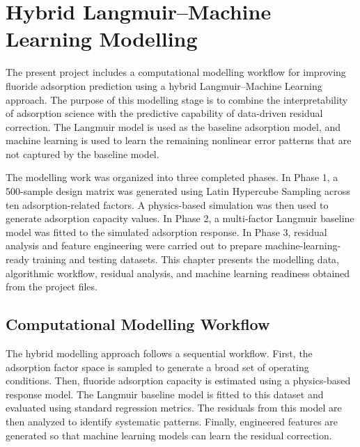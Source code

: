 \chapter{Hybrid Langmuir--Machine Learning Modelling}

The present project includes a computational modelling workflow for improving fluoride adsorption prediction using a hybrid Langmuir--Machine Learning approach. The purpose of this modelling stage is to combine the interpretability of adsorption science with the predictive capability of data-driven residual correction. The Langmuir model is used as the baseline adsorption model, and machine learning is used to learn the remaining nonlinear error patterns that are not captured by the baseline model.

The modelling work was organized into three completed phases. In Phase 1, a 500-sample design matrix was generated using Latin Hypercube Sampling across ten adsorption-related factors. A physics-based simulation was then used to generate adsorption capacity values. In Phase 2, a multi-factor Langmuir baseline model was fitted to the simulated adsorption response. In Phase 3, residual analysis and feature engineering were carried out to prepare machine-learning-ready training and testing datasets. This chapter presents the modelling data, algorithmic workflow, residual analysis, and machine learning readiness obtained from the project files.

\section{Computational Modelling Workflow}

The hybrid modelling approach follows a sequential workflow. First, the adsorption factor space is sampled to generate a broad set of operating conditions. Then, fluoride adsorption capacity is estimated using a physics-based response model. The Langmuir baseline model is fitted to this dataset and evaluated using standard regression metrics. The residuals from this model are then analyzed to identify systematic patterns. Finally, engineered features are generated so that machine learning models can learn the residual correction.

